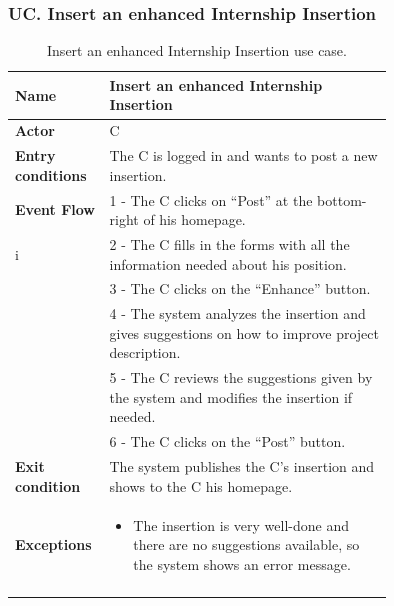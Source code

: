 \subsubsection*{UC\cuc . Insert an enhanced Internship Insertion}
\begin{center}
    \begin{longtable}{|l|p{0.75\linewidth}|}
        \hline
        \textbf{Name}               & Insert an enhanced Internship Insertion\\
        \hline
        \textbf{Actor}              & C\\
        \hline
        \textbf{Entry conditions}   & The C is logged in and wants to post a new insertion.\\
        \hline
        \textbf{Event Flow}         & 1 - The C clicks on “Post” at the bottom-right of his homepage. \\i
        & 2 - The C fills in the forms with all the information needed about his position. \\
        & 3 - The C clicks on the “Enhance” button. \\
        & 4 - The system analyzes the insertion and gives suggestions on how to improve project description. \\
        & 5 - The C reviews the suggestions given by the system and modifies the insertion if needed. \\
        & 6 - The C clicks on the “Post” button. \\
        \hline
        \textbf{Exit condition}   & The system publishes the C’s insertion and shows to the C his homepage. \\       
        \hline
        \textbf{Exceptions}       & \begin{itemize}
            \item The insertion is very well-done and there are no suggestions available, so the system shows an error message.
        \end{itemize}\\
        \hline
        \caption{Insert an enhanced Internship Insertion use case.}
        \label{tab: enhanced_internship_insertion_use_case}
    \end{longtable}
\end{center}


